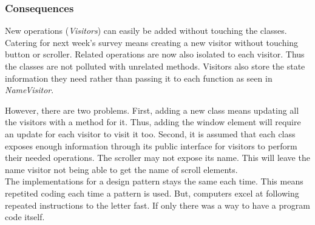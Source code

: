 \subsubsection{Consequences}
New operations (\textit{Visitors}) can easily be added without touching the classes.
Catering for next week's survey means creating a new visitor without touching button or scroller.
Related operations are now also isolated to each visitor.
Thus the classes are not polluted with unrelated methods.
Visitors also store the state information they need rather than passing it to each function as seen in \textit{NameVisitor}.

However, there are two problems.
First, adding a new class means updating all the visitors with a method for it.
Thus, adding the window element will require an update for each visitor to visit it too.
Second, it is assumed that each class exposes enough information through its public interface for visitors to perform their needed operations.
The scroller may not expose its name.
This will leave the name visitor not being able to get the name of scroll elements.\\

The implementations for a design pattern stays the same each time.
This means repetited coding each time a pattern is used.
But, computers excel at following repeated instructions to the letter fast.
If only there was a way to have a program code itself.